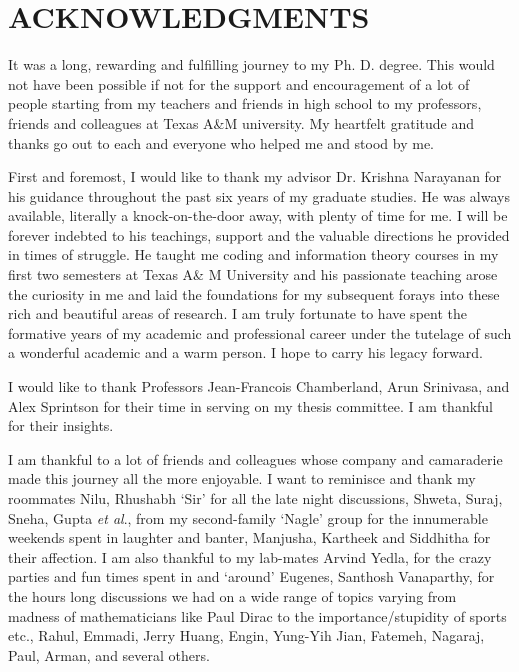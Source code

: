 %
%
%
%


\chapter*{ACKNOWLEDGMENTS}

It was a long, rewarding and fulfilling journey to my Ph. D. degree. This would not have been possible if not for the support and encouragement of a lot of people starting from my teachers and friends in high school to my professors, friends and colleagues at Texas A\&M university. My heartfelt gratitude and thanks go out to each and everyone who helped me and stood by me.

\indent First and foremost, I would like to thank my advisor Dr. Krishna Narayanan for his guidance throughout the past six years of my graduate studies. He was always available, literally a knock-on-the-door away, with plenty of time for me. I will be forever indebted to his teachings, support and the valuable directions he provided in times of struggle. He taught me coding and information theory courses in my first two semesters at Texas A\& M University and his passionate teaching arose the curiosity in me and laid the foundations for my subsequent forays into these rich and beautiful areas of research. I am truly fortunate to have spent the formative years of my academic and professional career under the tutelage of such a wonderful academic and a warm person. I hope to carry his legacy forward.

I would like to thank Professors Jean-Francois Chamberland, Arun Srinivasa, and Alex Sprintson for their time in serving on my thesis committee. I am thankful for their insights.

I am thankful to a lot of friends and colleagues whose company and camaraderie made this journey all the more enjoyable. I want to reminisce and thank my roommates Nilu, Rhushabh `Sir' for all the late night discussions, Shweta, Suraj, Sneha, Gupta \textit{et al}., from my second-family `Nagle' group for the innumerable weekends spent in laughter and banter, Manjusha, Kartheek and Siddhitha for their affection. I am also thankful to my lab-mates Arvind Yedla, for the crazy parties and fun times spent in and `around' Eugenes, Santhosh Vanaparthy, for the hours long discussions we had on a wide range of topics varying from madness of mathematicians like Paul Dirac to the importance/stupidity of sports etc., Rahul, Emmadi, Jerry Huang, Engin, Yung-Yih Jian, Fatemeh, Nagaraj, Paul, Arman, and several others.

